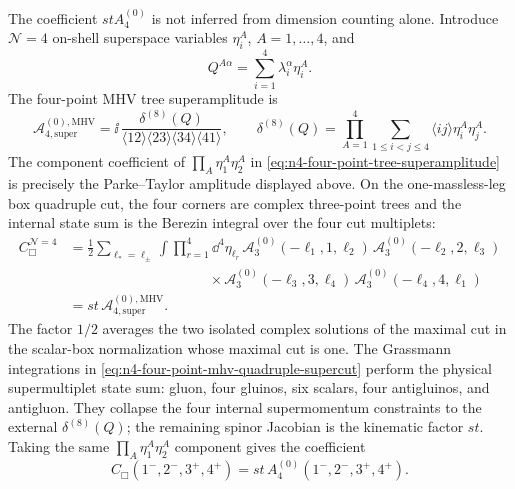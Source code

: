 The coefficient \(s t A_4^{(0)}\) is not inferred from dimension counting
alone.  Introduce \(\mathcal N=4\) on-shell superspace variables
\(\eta_i^A\), \(A=1,\ldots,4\), and
\[
  Q^{A\alpha}=\sum_{i=1}^4\lambda_i^\alpha\eta_i^A .
\]
The four-point MHV tree superamplitude is
\begin{equation}
  \mathcal A_{4,\mathrm{super}}^{(0),\mathrm{MHV}}
  =
  \ii\,
  \frac{\delta^{(8)}(Q)}
       {\langle12\rangle\langle23\rangle
        \langle34\rangle\langle41\rangle},
  \qquad
  \delta^{(8)}(Q)
  =
  \prod_{A=1}^4
  \sum_{1\le i<j\le4}
  \langle i j\rangle\eta_i^A\eta_j^A .
  \label{eq:n4-four-point-tree-superamplitude}
\end{equation}
The component coefficient of
\(\prod_A\eta_1^A\eta_2^A\) in
\eqref{eq:n4-four-point-tree-superamplitude} is precisely the
Parke--Taylor amplitude displayed above.  On the one-massless-leg box
quadruple cut, the four corners are complex three-point trees and the
internal state sum is the Berezin integral over the four cut multiplets:
\begin{equation}
  \begin{aligned}
  C_{\Box}^{\mathcal N=4}
  &=
  \frac12
  \sum_{\ell_*=\ell_\pm}
  \int\prod_{r=1}^4\dd^4\eta_{\ell_r}\,
  \mathcal A_3^{(0)}(-\ell_1,1,\ell_2)\,
  \mathcal A_3^{(0)}(-\ell_2,2,\ell_3)\\
  &\qquad\qquad\qquad\qquad\qquad
  \times
  \mathcal A_3^{(0)}(-\ell_3,3,\ell_4)\,
  \mathcal A_3^{(0)}(-\ell_4,4,\ell_1)\\
  &=
  s t\,\mathcal A_{4,\mathrm{super}}^{(0),\mathrm{MHV}} .
  \end{aligned}
  \label{eq:n4-four-point-mhv-quadruple-supercut}
\end{equation}
The factor \(1/2\) averages the two isolated complex solutions of the maximal
cut in the scalar-box normalization whose maximal cut is one.  The
Grassmann integrations in
\eqref{eq:n4-four-point-mhv-quadruple-supercut} perform the physical
supermultiplet state sum: gluon, four gluinos, six scalars, four antigluinos,
and antigluon.  They collapse the four internal supermomentum constraints to
the external \(\delta^{(8)}(Q)\); the remaining spinor Jacobian is the
kinematic factor \(s t\).  Taking the same
\(\prod_A\eta_1^A\eta_2^A\) component gives the coefficient
\[
  C_{\Box}(1^-,2^-,3^+,4^+)
  =
  s t\,A_4^{(0)}(1^-,2^-,3^+,4^+).
\]

